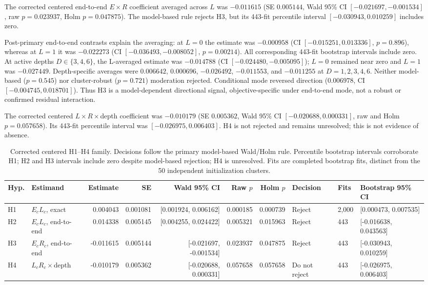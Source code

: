 \documentclass[pdflatex,sn-basic,Numbered]{sn-jnl}
\begin{document}
The corrected centered end-to-end $E\times R$ coefficient averaged across $L$ was $-0.011615$ (SE $0.005144$, Wald 95\% CI $[-0.021697,-0.001534]$, raw $p=0.023937$, Holm $p=0.047875$). The model-based rule rejects H3, but its 443-fit percentile interval $[-0.030943,0.010259]$ includes zero.

Post-primary end-to-end contrasts explain the averaging: at $L=0$ the estimate was $-0.000958$ (CI $[-0.015251,0.013336]$, $p=0.896$), whereas at $L=1$ it was $-0.022273$ (CI $[-0.036493,-0.008052]$, $p=0.00214$). All corresponding 443-fit bootstrap intervals include zero. At active depths $D\in\{3,4,6\}$, the L-averaged estimate was $-0.014788$ (CI $[-0.024480,-0.005095]$); $L=0$ remained near zero and $L=1$ was $-0.027449$. Depth-specific averages were $0.006642$, $0.000696$, $-0.026492$, $-0.011553$, and $-0.011255$ at $D=1,2,3,4,6$. Neither model-based ($p=0.545$) nor cluster-robust ($p=0.721$) moderation rejected. Conditional mode reversed direction ($0.006978$, CI $[-0.004745,0.018701]$). Thus H3 is a model-dependent directional signal, objective-specific under end-to-end mode, not a robust or confirmed residual interaction.

The corrected centered $L\times R\times$depth coefficient was $-0.010179$ (SE $0.005362$, Wald 95\% CI $[-0.020688,0.000331]$, raw and Holm $p=0.057658$). Its 443-fit percentile interval was $[-0.026975,0.006403]$. H4 is not rejected and remains unresolved; this is not evidence of absence.

\begin{table}[t]
\centering\scriptsize
\setlength{\tabcolsep}{2.5pt}
\begin{tabular}{llrrrrrlll}
\toprule
Hyp. & Estimand & Estimate & SE & Wald 95\% CI & Raw $p$ & Holm $p$ & Decision & Fits & Bootstrap 95\% CI \\
\midrule
H1 & $E_cL_c$, exact & 0.004043 & 0.001081 & [0.001924, 0.006162] & 0.000185 & 0.000739 & Reject & 2,000 & [0.000473, 0.007535] \\
H2 & $E_cL_c$, end-to-end & 0.014338 & 0.005145 & [0.004255, 0.024422] & 0.005321 & 0.015963 & Reject & 443 & [-0.016638, 0.043563] \\
H3 & $E_cR_c$, end-to-end & -0.011615 & 0.005144 & [-0.021697, -0.001534] & 0.023937 & 0.047875 & Reject & 443 & [-0.030943, 0.010259] \\
H4 & $L_cR_c\times$depth & -0.010179 & 0.005362 & [-0.020688, 0.000331] & 0.057658 & 0.057658 & Do not reject & 443 & [-0.026975, 0.006403] \\
\bottomrule
\end{tabular}
\caption{Corrected centered H1--H4 family. Decisions follow the primary model-based Wald/Holm rule. Percentile bootstrap intervals corroborate H1; H2 and H3 intervals include zero despite model-based rejection; H4 is unresolved. Fits are completed bootstrap fits, distinct from the 50 independent initialization clusters.}
\label{tab:confirmatory-summary}
\end{table}
\end{document}
